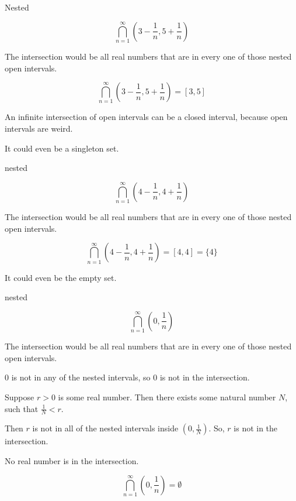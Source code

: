 \documentclass{ximera}
\begin{document}
\begin{example} Nested


\[ \bigcap_{n=1}^{\infty}   \left(3 - \frac{1}{n}, 5 + \frac{1}{n}\right)     \]



The intersection would be all real numbers that are in every one of those nested open intervals.


\[ \bigcap_{n=1}^{\infty}   \left(3 - \frac{1}{n}, 5 + \frac{1}{n}\right)  = [3, 5]   \]





\end{example}


An infinite intersection of open intervals can be a closed interval, because open intervals are weird.


It could even be a singleton set.




\begin{example} nested


\[ \bigcap_{n=1}^{\infty}   \left(4 - \frac{1}{n}, 4 +  \frac{1}{n}\right)     \]



The intersection would be all real numbers that are in every one of those nested open intervals.


\[ \bigcap_{n=1}^{\infty}   \left(4 -  \frac{1}{n}, 4 + \frac{1}{n}\right)    = [4, 4] = \{ 4 \}   \]





\end{example}





It could even be the empty set.



\begin{example} nested


\[ \bigcap_{n=1}^{\infty}   \left(0,  \frac{1}{n}\right)     \]



The intersection would be all real numbers that are in every one of those nested open intervals.


$0$ is not in any of the nested intervals, so $0$ is not in the intersection.


Suppose $r>0$ is some real number.  Then there exists some natural number $N$, such that $\frac{1}{N} < r$.

Then $r$ is not in all of the nested intervals inside $\left(0,  \frac{1}{N}\right)$. So, $r$ is not in the intersection.


No real number is in the intersection.


\[ \bigcap_{n=1}^{\infty}   \left(0,  \frac{1}{n}\right)  = \emptyset    \]



\end{example}
\end{document}
